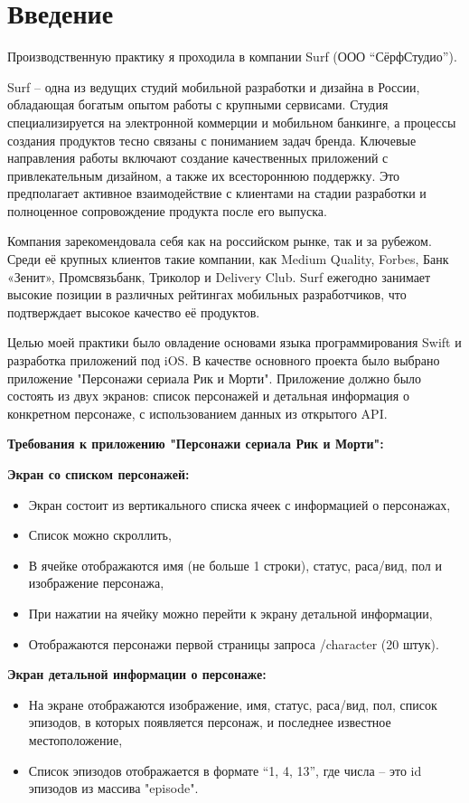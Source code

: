 \section*{Введение}

Производственную практику я проходила в компании Surf (ООО “СёрфСтудио”).

Surf – одна из ведущих студий мобильной разработки и дизайна в России, обладающая богатым опытом работы с крупными сервисами. Студия специализируется на электронной коммерции и мобильном банкинге, а процессы создания продуктов тесно связаны с пониманием задач бренда. Ключевые направления работы включают создание качественных приложений с привлекательным дизайном, а также их всестороннюю поддержку. Это предполагает активное взаимодействие с клиентами на стадии разработки и полноценное сопровождение продукта после его выпуска.

Компания зарекомендовала себя как на российском рынке, так и за рубежом. Среди её крупных клиентов такие компании, как Medium Quality, Forbes, Банк «Зенит», Промсвязьбанк, Триколор и Delivery Club. Surf ежегодно занимает высокие позиции в различных рейтингах мобильных разработчиков, что подтверждает высокое качество её продуктов.

Целью моей практики было овладение основами языка программирования Swift и разработка приложений под iOS. В качестве основного проекта было выбрано приложение "Персонажи сериала Рик и Морти". Приложение должно было состоять из двух экранов: список персонажей и детальная информация о конкретном персонаже, с использованием данных из открытого API.

\textbf{Требования к приложению "Персонажи сериала Рик и Морти":}

\textbf{Экран со списком персонажей:}
\begin{itemize}
    \item Экран состоит из вертикального списка ячеек с информацией о персонажах,
    \item Список можно скроллить,
    \item В ячейке отображаются имя (не больше 1 строки), статус, раса/вид, пол и изображение персонажа,
    \item При нажатии на ячейку можно перейти к экрану детальной информации,
    \item Отображаются персонажи первой страницы запроса /character (20 штук).
\end{itemize}

\textbf{Экран детальной информации о персонаже:}
\begin{itemize}
    \item На экране отображаются изображение, имя, статус, раса/вид, пол, список эпизодов, в которых появляется персонаж, и последнее известное местоположение,
    \item Список эпизодов отображается в формате “1, 4, 13”, где числа – это id эпизодов из массива "episode".
\end{itemize}

